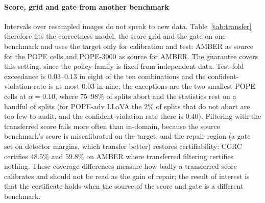 \begin{table}[t]
\centering
\caption{Certified coverage (\%, abort rate in parentheses) with channel 1 restricted to the VLM's own signals and with the full score. CCRC uses the
size-matched external gate in both cases (selected with the matching score); gain is against filtering with the same score.}
\label{tab:detfree}
\small
\resizebox{\textwidth}{!}{}
\end{table}

\paragraph{Score, grid and gate from another benchmark}
Intervals over resampled images do not speak to new data. Table~\ref{tab:transfer} therefore fits the correctness model, the score grid and the gate on one benchmark and uses
the target only for calibration and test: AMBER as source for the POPE cells and POPE-3000 as source for AMBER. The guarantee covers this setting, since
the policy family is fixed from independent data. Test-fold exceedance is $0.03$--$0.13$ in eight of the ten combinations and the confident-violation rate is at most $0.03$ in nine; the exceptions are the two smallest POPE cells at $\alpha=0.10$, where $75$--$98\%$ of splits abort and the statistics rest on a handful
of splits (for POPE-adv LLaVA the $2\%$ of splits that do not abort are too few to audit, and the confident-violation rate there is $0.40$). Filtering with the
transferred score fails more often than in-domain, because the source benchmark's score is miscalibrated on the target, and the repair region (a gate set on
detector margins, which transfer better) restores certifiability: CCRC certifies $48.5\%$ and $59.8\%$ on AMBER where transferred filtering certifies nothing. These coverage differences measure how badly a transferred score calibrates and
should not be read as the gain of repair; the result of interest is that the certificate holds when the source of the score and gate is a different benchmark.

\begin{table}[t]
\centering
\caption{Held-out benchmark. Score model, score grid and gate are fitted on the source benchmark; calibration and test folds come from the target. In-domain CCRC
is the size-matched external-gate result of Table~\ref{tab:main}. exc: test-fold exceedance of $\alpha$; cv: confident-violation rate.}
\label{tab:transfer}
\small
\resizebox{\textwidth}{!}{}
\end{table}

